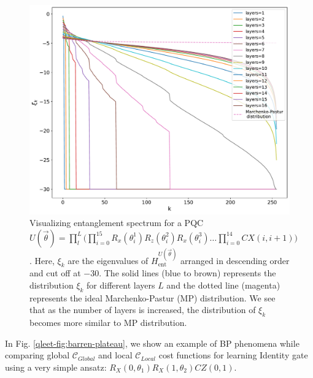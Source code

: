 \begin{figure}[!t]
    \centering
    \includegraphics[width=\linewidth]{figures/qleet/entanglement-spectrum.pdf}
    \caption[Visualizing entanglement spectrum for parameterized quantum circuits]{Visualizing entanglement spectrum for a PQC $U(\vec{\theta}) = \prod_{l}^{L}\big(\prod_{i=0}^{15}R_x(\theta_i^1)R_z(\theta_i^2)R_x(\theta_i^3)\ldots\prod_{i=0}^{14}CX(i, i+1)\big)$. Here, $\xi_k$ are the eigenvalues of $H_{\text{ent}}^{U(\vec{\theta})}$ arranged in descending order and cut off at $-30$. The solid lines (blue to brown) represents the distribution $\xi_k$ for different layers $L$ and the dotted line (magenta) represents the ideal Marchenko-Pastur (MP) distribution. We see that as the number of layers is increased, the distribution of $\xi_k$ becomes more similar to MP distribution.}
    \label{qleet-fig:entanglement-spectrum}
\end{figure}



In Fig. \ref{qleet-fig:barren-plateau}, we show an example of BP phenomena while comparing global $\mathcal{C}_{Global}$ and local $\mathcal{C}_{Local}$ cost functions for learning Identity gate using a very simple ansatz: $R_X(0,\theta_1)R_X(1, \theta_2)CZ(0, 1)$. 

